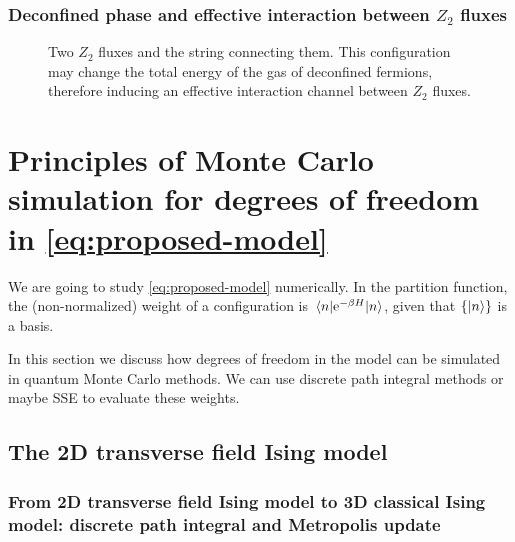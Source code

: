 \documentclass[hyperref, a4paper]{article}
\newcommand*{\ee}{\mathrm{e}}
\newcommand*{\Ztwo}{\texorpdfstring{$\mathbb{Z}_2$ }{Z2 }}
\newcommand*{\tfim}{transverse field Ising model}
\newcommand*{\cim}{classical Ising model}
\def\mathbb#1{#1}%
\begin{document}
\subsubsection{Deconfined phase and effective interaction between \Ztwo fluxes}

\begin{figure}
    \centering
    
    \caption{Two \Ztwo fluxes and the string connecting them. 
    This configuration may change the total energy of the gas of deconfined fermions, 
    therefore inducing an effective interaction channel between \Ztwo fluxes.}
\end{figure}

\section{Principles of Monte Carlo simulation for degrees of freedom in \eqref{eq:proposed-model}}

We are going to study \eqref{eq:proposed-model} numerically.
In the partition function, the (non-normalized) weight of a configuration is $\mel{n}{\ee^{-\beta H}}{n}$, given that $\{\ket{n}\}$ is a basis.

In this section we discuss how degrees of freedom in the model can be simulated in quantum Monte Carlo methods.
We can use discrete path integral methods or maybe SSE to evaluate these weights.

\subsection{The 2D \tfim{}}

\subsubsection{From 2D \tfim{} to 3D \cim: discrete path integral and Metropolis update}
\end{document}
